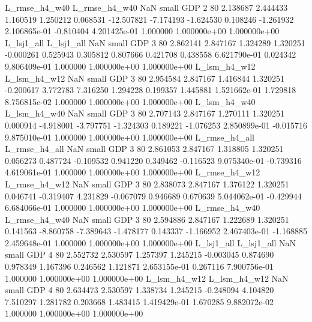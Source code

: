 L_rmse_h4_w40 L_rmse_h4_w40                   NaN      small      GDP                 2 80 2.138687       2.444433 1.160519       1.250212    0.068531    -12.507821     -7.174193    -1.624530       0.108246 -1.261932 2.106865e-01    -0.810404   4.201425e-01            1.000000    1.000000e+00        1.000000e+00
   L_lsj1_all    L_lsj1_all                   NaN      small      GDP                 3 80 2.862141       2.847167 1.324289       1.320251   -0.000261      0.525943      0.305812     0.807666       0.421708  0.438558 6.621790e-01     0.024342   9.806409e-01            1.000000    1.000000e+00        1.000000e+00
 L_lsm_h4_w12  L_lsm_h4_w12                   NaN      small      GDP                 3 80 2.954584       2.847167 1.416844       1.320251   -0.200617      3.772783      7.316250     1.294228       0.199357  1.445881 1.521662e-01     1.729818   8.756815e-02            1.000000    1.000000e+00        1.000000e+00
 L_lsm_h4_w40  L_lsm_h4_w40                   NaN      small      GDP                 3 80 2.707143       2.847167 1.270111       1.320251    0.000914     -4.918001     -3.797751    -1.324303       0.189221 -1.076253 2.850899e-01    -0.015716   9.875010e-01            1.000000    1.000000e+00        1.000000e+00
L_rmse_h4_all L_rmse_h4_all                   NaN      small      GDP                 3 80 2.861053       2.847167 1.318805       1.320251    0.056273      0.487724     -0.109532     0.941220       0.349462 -0.116523 9.075340e-01    -0.739316   4.619061e-01            1.000000    1.000000e+00        1.000000e+00
L_rmse_h4_w12 L_rmse_h4_w12                   NaN      small      GDP                 3 80 2.838073       2.847167 1.376122       1.320251    0.046741     -0.319407      4.231829    -0.067079       0.946689  0.670639 5.044062e-01    -0.429944   6.684066e-01            1.000000    1.000000e+00        1.000000e+00
L_rmse_h4_w40 L_rmse_h4_w40                   NaN      small      GDP                 3 80 2.594886       2.847167 1.222689       1.320251    0.141563     -8.860758     -7.389643    -1.478177       0.143337 -1.166952 2.467403e-01    -1.168885   2.459648e-01            1.000000    1.000000e+00        1.000000e+00
   L_lsj1_all    L_lsj1_all                   NaN      small      GDP                 4 80 2.552732       2.530597 1.257397       1.245215   -0.003045      0.874690      0.978349     1.167396       0.246562  1.121871 2.653155e-01     0.267116   7.900756e-01            1.000000    1.000000e+00        1.000000e+00
 L_lsm_h4_w12  L_lsm_h4_w12                   NaN      small      GDP                 4 80 2.634473       2.530597 1.338734       1.245215   -0.248094      4.104820      7.510297     1.281782       0.203668  1.483415 1.419429e-01     1.670285   9.882072e-02            1.000000    1.000000e+00        1.000000e+00
